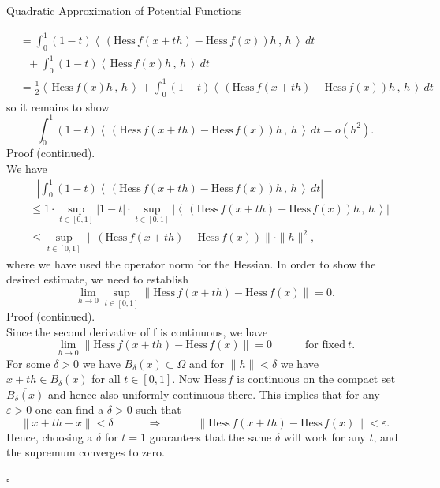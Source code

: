 \documentclass[smaller,hyperref={CJKbookmarks=true}]{beamer}
\newcommand{\scp}[2]{\left\langle\,#1\,,\,#2\,\right\rangle} \newcommand{\scpp}{\langle\,\cdot\,,\,\cdot\,\rangle}
\begin{document}
\begin{frame}{Quadratic Approximation of Potential Functions}
\begin{spacing}{1}
\begin{equation*}
\begin{split}
       &=\int_{0}^{1}(1-t)\scp{(\text{Hess}\,f(x+th)-\text{Hess}\,f(x))h}{h}\,dt  \\
       &~~~+\int_{0}^{1}(1-t)\scp{\text{Hess}\,f(x)h}{h}\,dt  \\
       &=\frac{1}{2}\scp{\text{Hess}\,f(x)h}{h}+\int_{0}^{1}(1-t)\scp{(\text{Hess}\,f(x+th)-\text{Hess}\,f(x))h}{h}\,dt
  \end{split}
\end{equation*}
so it remains to show
\[\int_{0}^{1}(1-t)\scp{(\text{Hess}\,f(x+th)-\text{Hess}\,f(x))h}{h}\,dt=o(h^2).\]
\newpage
\alert{Proof (continued).}\\
We have
\begin{equation*}
  \begin{split}
       &~~~\left|\int_{0}^{1}(1-t)\scp{(\text{Hess}\,f(x+th)-\text{Hess}\,f(x))h}{h}\,dt\right|  \\
       &\leq 1\cdot\sup\limits_{t\in[0,1]}|1-t|\cdot\sup\limits_{t\in[0,1]}|\scp{(\text{Hess}\,f(x+th)-\text{Hess}\,f(x))h}{h}|  \\
       &\leq\sup\limits_{t\in[0,1]}\|(\text{Hess}\,f(x+th)-\text{Hess}\,f(x))\|\cdot\|h\|^2,
  \end{split}
\end{equation*}
where we have used the operator norm for the Hessian. In order to show
the desired estimate, we need to establish
\[\lim_{h\to0}\sup\limits_{t\in[0,1]}\left\|
\text{Hess}\,f(x+th)-\text{Hess}\,f(x)\right\|=0.\]
\newpage
\alert{Proof (continued).}\\
Since the second derivative of f is continuous, we have
\[\lim_{h\to0}\|\text{Hess}\,f(x+th)-\text{Hess}\,f(x)\|=0
\qquad\quad\text{for fixed}~t.\]
For some $\delta>0$ we have $B_\delta(x)\subset\Omega$ and for $\|h\|<\delta$ we have $x+th\in B_\delta(x)$ for all $t\in[0,1]$. Now $\text{Hess}\,f$ is continuous on the compact set $\overline{B_\delta(x)}$ and hence also uniformly continuous there. This implies that for any $\varepsilon>0$ one can find a $\delta>0$ such that
\[\|x+th-x\|<\delta\qquad\quad\Rightarrow\qquad\quad
\|\text{Hess}\,f(x+th)-\text{Hess}\,f(x)\|<\varepsilon.\]
Hence, choosing a $\delta$ for $t=1$ guarantees that the same $\delta$ will work for any $t$, and the supremum converges to zero.
\begin{flushright}
  $\square$
\end{flushright}
\end{spacing}
\end{frame}
\end{document}
